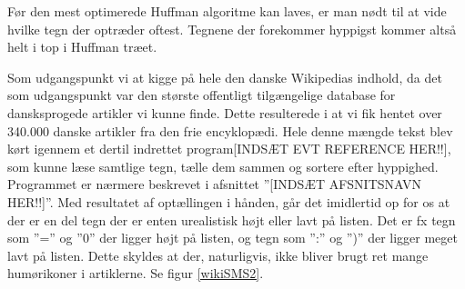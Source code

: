 

Før den mest optimerede Huffman algoritme kan laves, er man nødt til at vide hvilke tegn der optræder oftest. Tegnene der forekommer hyppigst kommer altså helt i top i Huffman træet.

Som udgangspunkt vi at kigge på hele den danske Wikipedias indhold, da det som udgangspunkt var den største offentligt tilgængelige database for dansksprogede artikler vi kunne finde. Dette resulterede i at vi fik hentet over 340.000 danske artikler fra den frie encyklopædi. Hele denne mængde tekst blev kørt igennem et dertil indrettet program[INDSÆT EVT REFERENCE HER!!], som kunne læse samtlige tegn, tælle dem sammen og sortere efter hyppighed. Programmet er nærmere beskrevet i afsnittet ”[INDSÆT AFSNITSNAVN HER!!]”.  Med resultatet af optællingen i hånden, går det imidlertid op for os at der er en del tegn der er enten urealistisk højt eller lavt på listen. Det er fx tegn som ”=” og ”0” der ligger højt på listen, og tegn som ”:” og ”)” der ligger meget lavt på listen. Dette skyldes at der, naturligvis, ikke bliver brugt ret mange humørikoner i artiklerne. Se figur \ref{wikiSMS2}.

